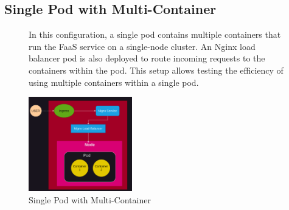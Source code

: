 \documentclass{article}
\begin{document}
\subsection{Single Pod with Multi-Container}
\nobreak
\begin{figure}[h]
    \begin{minipage}[b]{0.6\textwidth}
        \flushleft
        In this configuration, a single pod contains multiple containers that run the
        FaaS service on a single-node cluster. An Nginx load balancer pod is also
        deployed to route incoming requests to the containers within the pod. This
        setup allows testing the efficiency of using multiple containers within a
        single pod.
    \end{minipage}%
    \hfill
    \begin{minipage}[b]{0.4\textwidth}
        \centering
        \includegraphics[width=0.4\textwidth]{../images/one_pod_two_container.png}
        \caption{Single Pod with Multi-Container}
        \label{fig:single_pod_multi_container}
    \end{minipage}
\end{figure}
\end{document}
